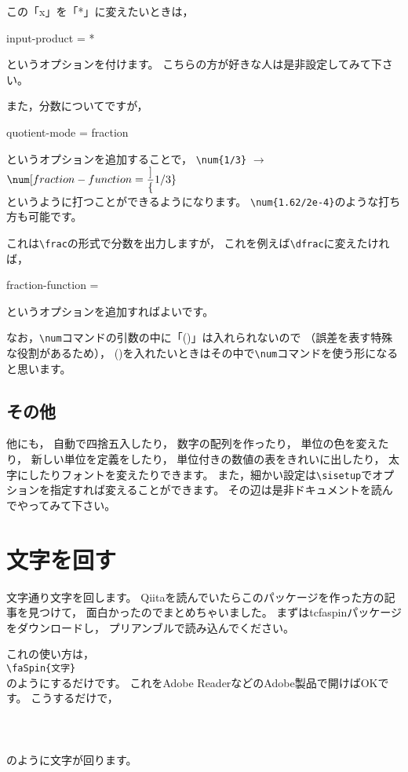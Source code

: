 この「x」を「*」に変えたいときは，
\begin{ITeX}
input-product = *
\end{ITeX}
というオプションを付けます。
こちらの方が好きな人は是非設定してみて下さい。

また，分数についてですが，
\begin{ITeX}
quotient-mode = fraction
\end{ITeX}
というオプションを追加することで，
\hspace{5zw} \verb|\num{1/3}| $\rightarrow$ $\num[fraction-function = \dfrac]{1/3}$ \\
というように打つことができるようになります。
\verb|\num{1.62/2e-4}|のような打ち方も可能です。

これは\verb|\frac|の形式で分数を出力しますが，
これを例えば\verb|\dfrac|に変えたければ，
\begin{ITeX}
fraction-function = \dfrac
\end{ITeX}
というオプションを追加すればよいです。

なお，\verb|\num|コマンドの引数の中に「()」は入れられないので
（誤差を表す特殊な役割があるため），
()を入れたいときはその中で\verb|\num|コマンドを使う形になると思います。


\subsection{その他}
他にも，
自動で四捨五入したり，
数字の配列を作ったり，
単位の色を変えたり，
新しい単位を定義をしたり，
単位付きの数値の表をきれいに出したり，
太字にしたりフォントを変えたりできます。
また，細かい設定は\verb|\sisetup|でオプションを指定すれば変えることができます。
その辺は是非ドキュメントを読んでやってみて下さい。







\section{文字を回す}
文字通り文字を回します。
Qiitaを読んでいたらこのパッケージを作った方の記事を見つけて，
面白かったのでまとめちゃいました。
まずはtcfaspinパッケージをダウンロードし，
プリアンブルで読み込んでください。

これの使い方は，\\
\hspace{5zw} \verb|\faSpin{文字}| \\
のようにするだけです。
これをAdobe ReaderなどのAdobe製品で開けばOKです。
こうするだけで，\\
\vspace{3zw} \\
\hspace{5zw}  \\
\vspace{3zw} \\
のように文字が回ります。

